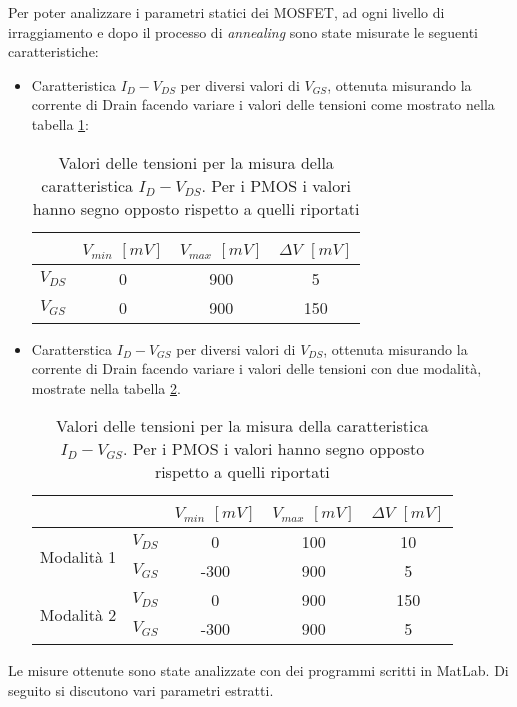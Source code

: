 Per poter analizzare i parametri statici dei MOSFET, ad ogni livello di irraggiamento e dopo il processo di \emph{annealing} sono state misurate le seguenti caratteristiche:

\begin{itemize}

\item{Caratteristica $I_D-V_{DS}$} per diversi valori di $V_{GS}$, ottenuta misurando la corrente di Drain facendo variare i valori delle tensioni come mostrato nella tabella \ref{tab:tensioniIdVds}:

\begin{table}[ht]
  \renewcommand{\arraystretch}{1.3}
  \centering
    \begin{tabular}{c c c c}
      \toprule
         & $V_{min}$ $[mV]$ & $V_{max}$ $[mV]$ & $\Delta V$ $[mV]$ \\
     \midrule
	  $V_{DS}$ & 0 & 900 & 5 \\
	\hline
	   $V_{GS}$ & 0 & 900 & 150\\
      \bottomrule
    \end{tabular}
  \caption[Valori delle tensioni per la misura della caratteristica $I_D-V_{DS}$]{Valori delle tensioni per la misura della caratteristica $I_D-V_{DS}$. Per i PMOS i valori hanno segno opposto rispetto a quelli riportati}
  \label{tab:tensioniIdVds}
\end{table}

\item{Caratterstica $I_D-V_{GS}$} per diversi valori di $V_{DS}$, ottenuta misurando la corrente di Drain facendo variare i valori delle tensioni con due modalità, mostrate nella tabella \ref{tab:tensioniIdVgs}. 

\begin{table}[ht]
  \renewcommand{\arraystretch}{1.3}
  \centering
    \begin{tabular}{c c c c c}
      \toprule
        & & $V_{min}$ $[mV]$ & $V_{max}$ $[mV]$ & $\Delta V$ $[mV]$ \\
     \midrule
	  \multirow{2}{*}{Modalità 1} & $V_{DS}$ & 0 & 100 & 10 \\
	\cmidrule{2-5}
	  & $V_{GS}$ & -300 & 900 & 5\\
	\midrule
	  \multirow{2}{*}{Modalità 2} & $V_{DS}$ & 0 & 900 & 150 \\
	\cmidrule{2-5}
	  & $V_{GS}$ & -300 & 900 & 5\\
      \bottomrule
    \end{tabular}
  \caption[Valori delle tensioni per la misura della caratteristica $I_D-V_{GS}$]{Valori delle tensioni per la misura della caratteristica $I_D-V_{GS}$. Per i PMOS i valori hanno segno opposto rispetto a quelli riportati}
  \label{tab:tensioniIdVgs}
\end{table}

\end{itemize}


Le misure ottenute sono state analizzate con dei programmi scritti in MatLab. Di seguito si discutono vari parametri estratti.
